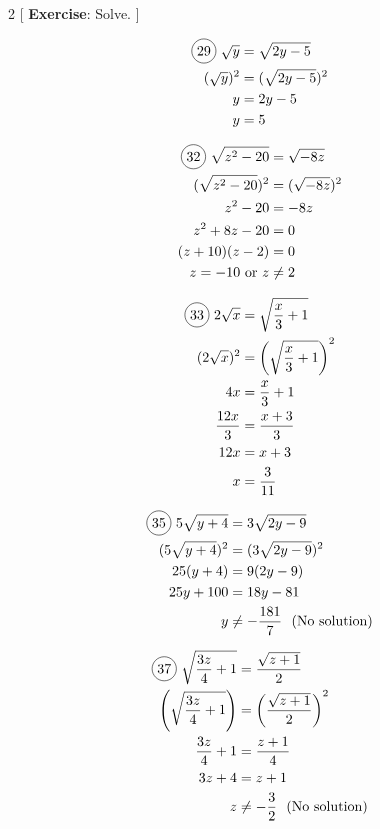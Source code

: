 \begin{multicols}{2}
[
  \textbf{Exercise}: Solve.
]

\begin{align*}
  \circled{29}\ \sqrt{y}&=\sqrt{2y-5}\\
  (\sqrt{y})^{2}&=(\sqrt{2y-5})^{2}\\
  y&=2y-5\\
  y&=5\\
\end{align*}

\begin{align*}
  \circled{32}\ \sqrt{z^{2}-20}&=\sqrt{-8z}\\
  (\sqrt{z^{2}-20})^{2}&=(\sqrt{-8z})^{2}\\
  z^{2}-20&=-8z\\
  z^{2}+8z-20&=0\\
  (z+10)(z-2)&=0\\
  z=-10 \text{ or } z&\neq2
\end{align*}

\begin{align*}
  \circled{33}\ 2\sqrt{x}&=\sqrt{\frac{x}{3}+1}\\
  (2\sqrt{x})^{2}&=\left( \sqrt{\frac{x}{3}+1} \right)^{2}\\
  4x&=\frac{x}{3}+1\\
  \frac{12x}{3}&=\frac{x+3}{3}\\
  12x&=x+3\\
  x&=\frac{3}{11}\\
\end{align*}

\begin{align*}
  \circled{35}\ 5\sqrt{y+4}&=3\sqrt{2y-9}\\
  (5\sqrt{y+4})^{2}&=(3\sqrt{2y-9})^{2}\\
  25(y+4)&=9(2y-9)\\
  25y+100&=18y-81\\
  y&\neq-\frac{181}{7}\ \text{ (No solution)}
\end{align*}

\begin{align*}
  \circled{37}\ \sqrt{\frac{3z}{4}+1}&=\frac{\sqrt{z+1}}{2}\\
  \left( \sqrt{\frac{3z}{4}+1}\right) &=\left( \frac{\sqrt{z+1}}{2} \right)^{2}\\
  \frac{3z}{4}+1&=\frac{z+1}{4}\\
  3z+4&=z+1\\
  z&\neq-\frac{3}{2}\ \text{ (No solution)}
\end{align*}


\end{multicols}
